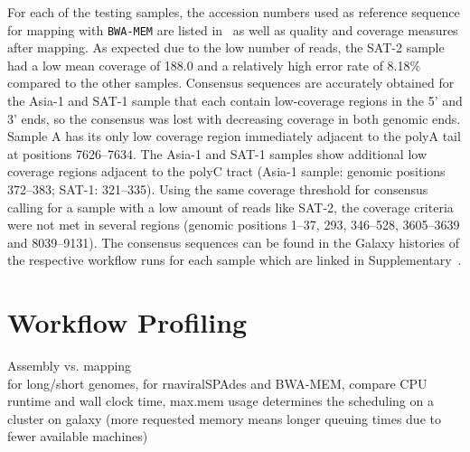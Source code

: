 For each of the testing samples, the accession numbers used as reference sequence for mapping with \texttt{BWA-MEM} are listed in~ as well as quality and coverage measures after mapping. As expected due to the low number of reads, the SAT-2 sample had a low mean coverage of {188.0\texttimes } and a relatively high error rate of 8.18\% compared to the other samples. Consensus sequences are accurately obtained for the Asia-1 and SAT-1 sample that each contain low-coverage regions in the 5' and 3' ends, so the consensus was lost with decreasing coverage in both genomic ends. Sample A has its only low coverage region immediately adjacent to the polyA tail at positions 7626--7634. The Asia-1 and SAT-1 samples show additional low coverage regions adjacent to the polyC tract (Asia-1 sample: genomic positions 372--383; SAT-1: 321--335). Using the same coverage threshold for consensus calling for a sample with a low amount of reads like SAT-2, the coverage criteria were not met in several regions (genomic positions 1--37, 293, 346--528, 3605--3639 and 8039--9131). The consensus sequences can be found in the Galaxy histories of the respective workflow runs for each sample which are linked in Supplementary~.

\section{Workflow Profiling}
\todoit Assembly vs. mapping\\
for long/short genomes, for rnaviralSPAdes and BWA-MEM, compare CPU runtime and wall clock time, max.mem usage determines the scheduling on a cluster on galaxy (more requested memory means longer queuing times due to fewer available machines)

